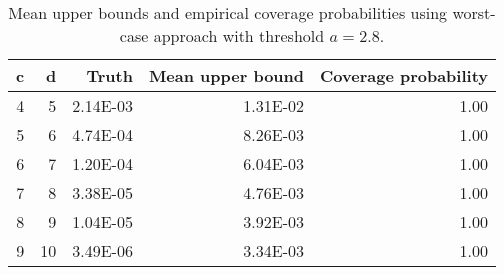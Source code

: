 \begin{table}[ht]
\centering
\begin{tabular}{rrrrr}
  \hline
c & d & Truth & Mean upper bound & Coverage probability \\ 
  \hline
  4 &   5 & 2.14E-03 & 1.31E-02 & 1.00 \\ 
    5 &   6 & 4.74E-04 & 8.26E-03 & 1.00 \\ 
    6 &   7 & 1.20E-04 & 6.04E-03 & 1.00 \\ 
    7 &   8 & 3.38E-05 & 4.76E-03 & 1.00 \\ 
    8 &   9 & 1.04E-05 & 3.92E-03 & 1.00 \\ 
    9 &  10 & 3.49E-06 & 3.34E-03 & 1.00 \\ 
   \hline
\end{tabular}
\caption{Mean upper bounds and empirical coverage probabilities using worst-case approach with threshold $a = 2.8$.} 
\label{Tab:robustnessOptim2}
\end{table}
